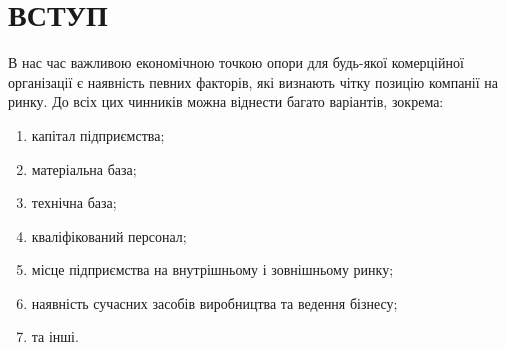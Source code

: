 








\tableofcontents


%

\section*{ВСТУП}
В нас час важливою економічною точкою опори для будь-якої комерційної організації є наявність певних факторів, які визнають чітку позицію компанії на ринку. До всіх цих чинників можна віднести багато варіантів, зокрема:
\begin{enumerate}
\item капітал підприємства;
\item матеріальна база;
\item технічна база;
\item кваліфікований персонал;
\item місце підприємства на внутрішньому і зовнішньому ринку;
\item наявність сучасних засобів виробництва та ведення бізнесу;
\item та інші.
\end{enumerate}

